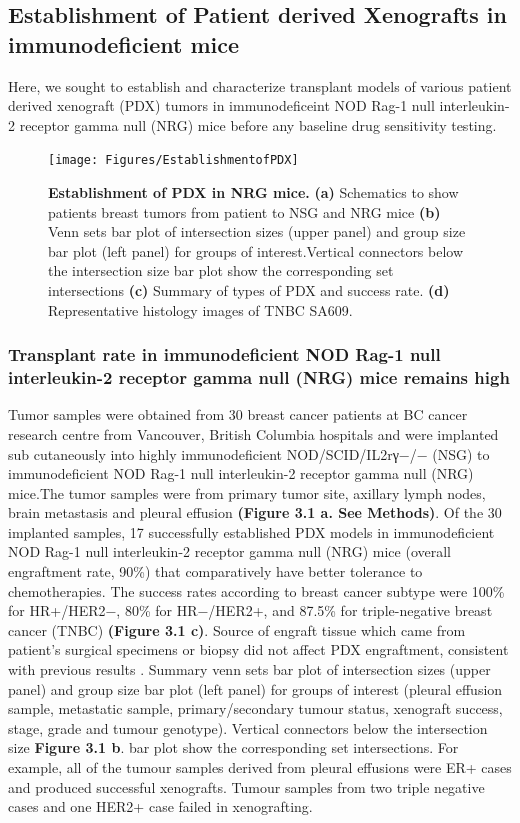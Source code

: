 \subsection{Establishment of Patient derived Xenografts in immunodeficient mice}

Here, we sought to establish and characterize transplant models of various patient derived xenograft (PDX) tumors in immunodeficeint NOD Rag-1 null interleukin-2 receptor gamma null (NRG) mice before any baseline drug sensitivity testing.

\begin{figure}
	\centering
	\texttt{[image: Figures/EstablishmentofPDX]}
	\caption[Establishment of PDX in NRG mice]
	{\small
	    \textbf{Establishment of PDX in NRG mice.}
	    \textbf{(a)} Schematics to show patients breast tumors from patient to NSG and NRG mice 
	    \textbf{(b)} Venn sets bar plot of intersection sizes (upper panel) and group size bar plot  (left panel) for groups of interest.Vertical connectors below the intersection size
bar plot show the corresponding set intersections
	    \textbf{(c)} Summary of types of PDX and success rate.
	     \textbf{(d)} Representative histology images of TNBC SA609. 
	}
	\label{fig:EstablishmentofPDX }
\end{figure}

\subsubsection{Transplant rate in immunodeficient NOD Rag-1 null interleukin-2 receptor gamma null (NRG) mice  remains high}
Tumor samples were obtained from 30 breast cancer patients at BC cancer research centre from Vancouver, British Columbia hospitals and were implanted sub cutaneously into highly immunodeficient NOD/SCID/IL2rγ−/− (NSG) to immunodeficient NOD Rag-1 null interleukin-2 receptor gamma null (NRG) mice.The tumor samples were from primary tumor site, axillary lymph nodes, brain metastasis and pleural effusion \textbf{(Figure 3.1 a. See Methods)}.
Of the 30 implanted samples, 17 successfully established PDX models in immunodeficient NOD Rag-1 null interleukin-2 receptor gamma null (NRG) mice (overall engraftment rate, 90\%) that comparatively have better tolerance to chemotherapies. The success rates according to breast cancer subtype were 100\% for HR+/HER2−, 80\% for HR−/HER2+, and 87.5\% for triple-negative breast cancer (TNBC) \textbf{(Figure 3.1 c)}. Source of engraft tissue which came from patient's surgical specimens or biopsy did not affect PDX engraftment, consistent with previous results \cite{ryu2019integrative}. Summary venn sets bar plot of intersection sizes (upper panel) and group size bar plot  (left panel) for groups of interest (pleural effusion sample, metastatic sample, primary/secondary tumour status, xenograft success, stage, grade and tumour genotype). Vertical connectors below the intersection size \textbf{Figure 3.1 b}.
bar plot show the corresponding set intersections. For example, all of the tumour samples derived from pleural effusions were ER+ cases and produced successful xenografts. Tumour samples from two triple negative cases and one HER2+ case failed in xenografting.



